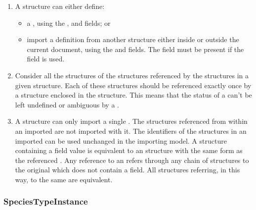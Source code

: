 \documentclass{cekarticle}
\begin{document}
\begin{enumerate}

\item A  structure can either define:

\begin{itemize}

\item a , using the
,  and
 fields; or

\item import a definition from another 
structure either inside or outside the current document, using the
 and  fields.  The  field
must be present if the  field is used.

\end{itemize}

\item Consider all the  structures of the
 structures referenced by the
 structures in a given
 structure. Each of these 
structures should be referenced exactly once by a
 structure enclosed in the
 structure.  This means that the status of a
 can't be left undefined or ambiguous by a
.

\item A  structure can only import a single
.  The  structures
referenced from within an imported  are not
imported with it.  The identifiers of the 
structures in an imported  can be used
unchanged in the importing model. A  structure
containing a  field value is equivalent to an
 structure with the same form as the referenced
.  Any reference to an 
refers through any chain of  structures to the
original  which does not contain a
 field. All  structures referring,
in this way, to the same  are equivalent.

\end{enumerate}

\subsubsection{SpeciesTypeInstance}
\end{document}
